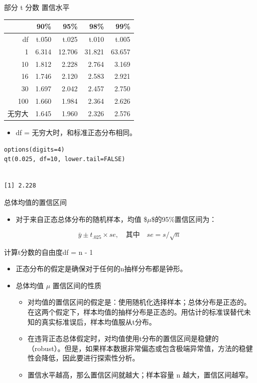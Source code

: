 \documentclass[presentation]{beamer}
\begin{document}
\begin{frame}[fragile,label={sec:orgdbd302d}]{部分 t 分数}
 \alert{置信水平}  

\begin{center}
\begin{tabular}{rrrrr}
 & 90\% & 95\% & 98\% & 99\%\\
\hline
df & t.050 & t.025 & t.010 & t.005\\
1 & 6.314 & 12.706 & 31.821 & 63.657\\
10 & 1.812 & 2.228 & 2.764 & 3.169\\
16 & 1.746 & 2.120 & 2.583 & 2.921\\
30 & 1.697 & 2.042 & 2.457 & 2.750\\
100 & 1.660 & 1.984 & 2.364 & 2.626\\
无穷大 & 1.645 & 1.960 & 2.326 & 2.576\\
\end{tabular}
\end{center}

\begin{itemize}
\item df = 无穷大时，和标准正态分布相同。
\end{itemize}
\begin{verbatim}
options(digits=4)
qt(0.025, df=10, lower.tail=FALSE)
\end{verbatim}

\begin{verbatim}

[1] 2.228
\end{verbatim}
\end{frame}

\begin{frame}[label={sec:org9165856}]{总体均值的置信区间}
\begin{itemize}
\item 对于来自正态总体分布的随机样本，均值 \$\(\mu\)\$的95\%置信区间为：
\end{itemize}

$$\bar y \pm t_.025 \times se, \quad 其中 \quad se=s/\sqrt n$$

计算t分数的自由度df = n - 1

\begin{itemize}
\item 正态分布的假定是确保对于任何的n抽样分布都是钟形。

\item \alert{总体均值 \(\mu\) 置信区间的性质}  
\begin{itemize}
\item 对均值的置信区间的假定是：使用随机化选择样本；总体分布是正态的。在这两个假定下，样本均值的抽样分布是正态的。用估计的标准误替代未知的真实标准误后，样本均值服从t分布。

\item 在违背正态总体假定时，对均值使用t分布的置信区间是稳健的（robust）。但是，如果样本数据非常偏态或包含极端异常值，方法的稳健性会降低，因此要进行探索性分析。

\item 置信水平越高，那么置信区间就越大；样本容量 n 越大，置信区间越窄。
\end{itemize}
\end{itemize}
\end{frame}
\end{document}
